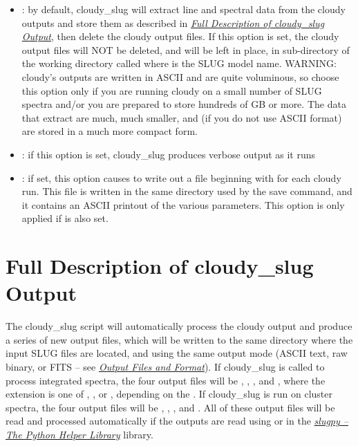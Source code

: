\documentclass[letterpaper,10pt,english]{sphinxmanual}
\begin{document}
\begin{itemize}
\item {} 
: by default, cloudy\_slug will extract line and
spectral data from the cloudy outputs and store them as described in
{\hyperref[cloudy:ssec\string-cloudy\string-output]{\emph{Full Description of cloudy\_slug Output}}}, then delete the cloudy output files. If
this option is set, the cloudy output files will NOT be deleted, and
will be left in place, in sub-directory of the working directory
called  where  is the SLUG model
name. WARNING: cloudy's outputs are written in ASCII and are quite
voluminous, so choose this option only if you are running
cloudy on a small number of SLUG spectra and/or you are prepared to
store hundreds of GB or more. The data that  extract
are much, much smaller, and (if you do not use ASCII format) are
stored in a much more compact form.

\item {} 
: if this option is set, cloudy\_slug produces
verbose output as it runs

\item {} 
: if set, this option causes 
to write out a file beginning with  for each
cloudy run. This file is written in the same directory used by the
save command, and it contains an ASCII printout of the various
parameters. This option is only applied if  is also set.

\end{itemize}


\section{Full Description of cloudy\_slug Output}
\label{cloudy:ssec-cloudy-output}\label{cloudy:full-description-of-cloudy-slug-output}
The cloudy\_slug script will automatically process the cloudy output
and produce a series of new output files, which will be written to the
same directory where the input SLUG files are located, and using the
same output mode (ASCII text, raw binary, or FITS -- see
{\hyperref[output:sec\string-output]{\emph{Output Files and Format}}}). If cloudy\_slug is called to process integrated
spectra, the four output files will be
,
,
, and
, where the extension 
is one of , , or , depending on the
. If cloudy\_slug is run on cluster spectra, the four
output files will be
,
,
, and
. All of these output files will
be read and processed automatically if the outputs are read using
 or  in the {\hyperref[slugpy:sec\string-slugpy]{\emph{slugpy -- The Python Helper Library}}}
library.
\end{document}
